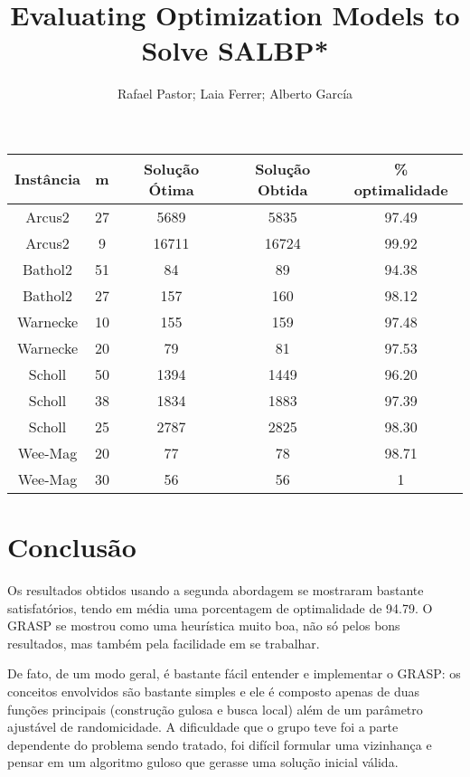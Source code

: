 \documentclass{report}
\begin{document}
{\begin{table}[htbp]
 \begin{tabular}{|c|c|c|c|c|}
  \hline
  \textbf{Instância} & \textbf{m} & \textbf{Solução Ótima} & \textbf{Solução Obtida} & \% optimalidade \\
  \hline
  Arcus2 & 27 & 5689 & 5835 & 97.49 \\
  \hline
  Arcus2 & 9 & 16711 & 16724 & 99.92 \\
  \hline
  Bathol2 & 51 & 84 & 89 & 94.38 \\
  \hline
  Bathol2 & 27 & 157 & 160 & 98.12 \\
  \hline
  Warnecke & 10 & 155 & 159 & 97.48 \\
  \hline
  Warnecke & 20 & 79 & 81 & 97.53 \\
  \hline
  Scholl & 50 & 1394 & 1449 & 96.20 \\
  \hline
  Scholl & 38 & 1834 & 1883 & 97.39 \\
  \hline
  Scholl & 25 & 2787 & 2825 & 98.30 \\
  \hline
  Wee-Mag & 20 & 77 & 78 & 98.71 \\
  \hline
  Wee-Mag & 30 & 56 & 56 & 1 \\
  \hline
 \end{tabular}
\end{table}

\chapter{Conclusão}

Os resultados obtidos usando a segunda abordagem se mostraram bastante
satisfatórios, tendo em média uma porcentagem de optimalidade de 94.79. O
GRASP se mostrou como uma heurística muito boa, não só pelos bons resultados,
mas também pela facilidade em se
trabalhar.

De fato, de um modo geral, é bastante fácil entender e implementar o GRASP:
os conceitos envolvidos são bastante simples e ele é composto apenas de duas
funções principais (construção gulosa e busca local) além de um parâmetro
ajustável de randomicidade. A dificuldade  que o grupo teve foi a parte
dependente do problema sendo tratado, foi difícil formular uma vizinhança e
pensar em um algoritmo guloso que gerasse uma solução inicial válida.


    \title{Evaluating Optimization Models to Solve SALBP*}
    \author{Rafael Pastor; Laia Ferrer; Alberto García}

}
\end{document}
